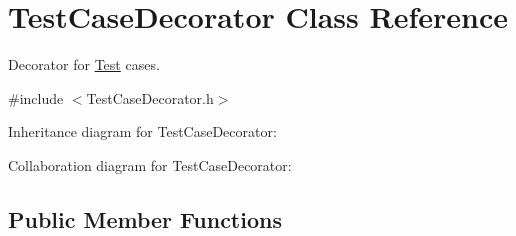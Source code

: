 \hypertarget{class_test_case_decorator}{\section{Test\+Case\+Decorator Class Reference}
\label{class_test_case_decorator}
}


Decorator for \hyperlink{class_test}{Test} cases.  




{\ttfamily \#include $<$Test\+Case\+Decorator.\+h$>$}



Inheritance diagram for Test\+Case\+Decorator\+:


Collaboration diagram for Test\+Case\+Decorator\+:
\subsection*{Public Member Functions}
